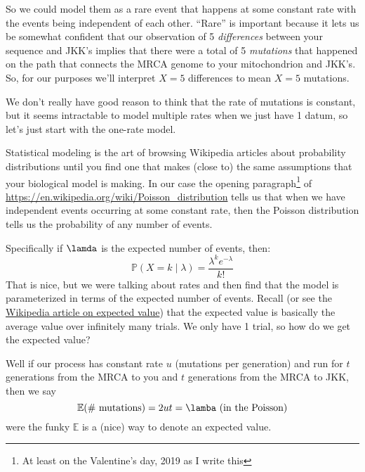 \documentclass[11pt]{article}
\renewcommand{\Pr}{\mathbb{P}}
\newcommand{\href}[2]{\url{#2}}
\begin{document}
So we could model them as a rare event that happens at some constant rate with the
    events being independent of each other.
``Rare'' is important because it lets us be somewhat confident that our
    observation of 5 {\em differences} between your sequence and JKK's
    implies that there were a total of 5 {\em mutations} that happened on 
    the path that connects the MRCA genome to your mitochondrion and JKK's.
So, for our purposes we'll interpret $X=5$ differences to mean $X=5$ mutations.

We don't really have good reason to think that the rate of mutations is constant, but
    it seems intractable to model multiple rates when we just have 1 datum, so let's
    just start with the one-rate model.

Statistical modeling is the art of browsing Wikipedia articles about probability 
    distributions until you find one that makes (close to) the same assumptions
    that your biological model is making.
In our case the opening paragraph\footnote{At least on the Valentine's day, 2019
as I write this}
of \url{https://en.wikipedia.org/wiki/Poisson_distribution}
tells us that when we have independent events occurring at some constant rate, then
the Poisson distribution tells us the probability of any number of events.

Specifically if $\lamda$ is the expected number of events, then:
\begin{equation}
    \Pr(X=k\mid \lambda) = \frac{\lambda^k e^{-\lambda}}{k!}
\end{equation}
That is nice, but we were talking about rates and then find that
the model is parameterized in terms of the expected number of events.
Recall (or see the \href{https://en.wikipedia.org/wiki/Expected_value}{Wikipedia article on expected value}) that the expected value is basically the average value over
infinitely many trials.
We only have 1 trial, so how do we get the expected value?

Well if our process has constant rate $u$ (mutations per generation) and run for
$t$ generations from the MRCA to you and $t$ generations from the MRCA to JKK, then we say
\begin{equation}
 \mathbb{E}(\mbox{\# mutations)} = 2 u t = \lamba \mbox{ (in the Poisson)}
\end{equation}
were the funky $\mathbb{E}$ is a (nice) way to denote an expected value.
\end{document}
